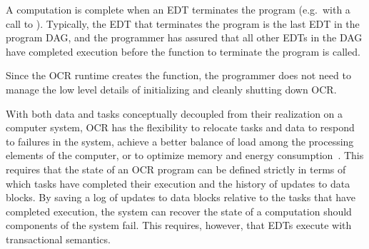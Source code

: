 A computation is complete when an EDT terminates the program
(e.g.\ with a call to ). Typically, the EDT that
terminates the program is the last EDT in the program DAG, and the
programmer has assured that all other EDTs in the DAG have completed
execution before the function to terminate the program is called.

Since the OCR runtime creates the 
function, the programmer does not need to manage the low level
details of initializing and cleanly shutting down OCR.

With both data and tasks conceptually decoupled from their realization
on a computer system, OCR has the flexibility to relocate tasks and data
to respond to failures in the system, achieve a better balance of load
among the processing elements of the computer, or to optimize memory
and energy consumption~\cite{GZCS10,Guo10,CTBCCGYS13,SbBS14}.
This requires that the state of an OCR program can be defined
strictly in terms of which tasks have completed their execution
and the history of updates to data blocks. By saving a log of updates to data blocks
relative to the tasks that have completed execution, the system can recover
the state of a computation should components of the system fail. This requires,
however, that EDTs execute with transactional semantics.
